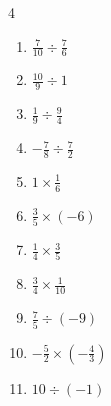 \begin{multicols}{4}
\begin{enumerate}

  \item $\displaystyle \frac{7}{10}\div{}\frac{7}{6}$


  \item $\displaystyle \frac{10}{9}\div{}1$


  \item $\displaystyle \frac{1}{9}\div{}\frac{9}{4}$


  \item $\displaystyle -\frac{7}{8}\div{}\frac{7}{2}$


  \item $\displaystyle 1\times{}\frac{1}{6}$


  \item $\displaystyle \frac{3}{5}\times{}\left(-6\right)$


\columnbreak %

\resetques

  \item $\displaystyle \frac{1}{4}\times{}\frac{3}{5}$


  \item $\displaystyle \frac{3}{4}\times{}\frac{1}{10}$


  \item $\displaystyle \frac{7}{5}\div{}\left(-9\right)$


  \item $\displaystyle -\frac{5}{2}\times{}\left(-\frac{4}{3}\right)$


  \item $\displaystyle 10\div{}\left(-1\right)$

        \phantom{$\displaystyle =-10$}


\end{enumerate}
\end{multicols}
